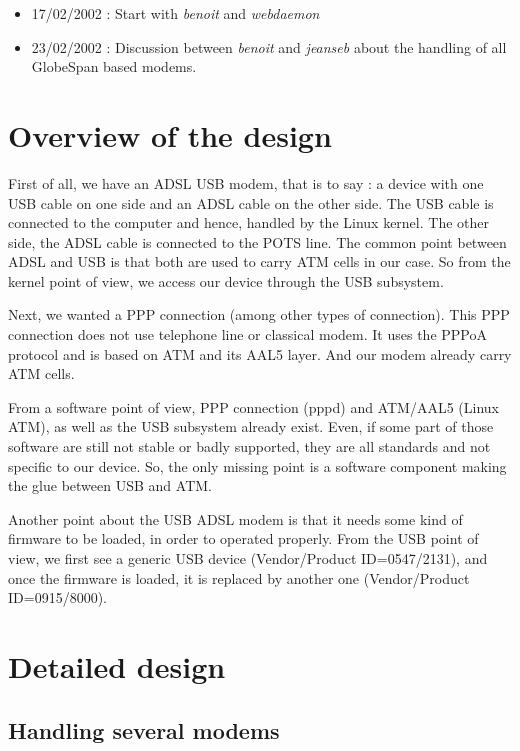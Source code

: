 \documentclass[a4paper,12pt]{article}
\begin{document}
\begin{itemize}
\item 17/02/2002 : Start with \textit{benoit} and \textit{webdaemon}
\item 23/02/2002 : Discussion between \textit{benoit} and
  \textit{jeanseb} about the handling of all GlobeSpan based modems.
\end{itemize}

\section{Overview of the design}

First of all, we have an ADSL USB modem, that is to say : a device
with one USB cable on one side and an ADSL cable on the other side.
The USB cable is connected to the computer and hence, handled by the
Linux kernel. The other side, the ADSL cable is connected to the POTS
line. The common point between ADSL and USB is that both are used to
carry ATM cells in our case. So from the kernel point of view, we
access our device through the USB subsystem.

Next, we wanted a PPP connection (among other types of connection).
This PPP connection does not use telephone line or classical modem. It
uses the PPPoA protocol and is based on ATM and its AAL5 layer. And
our modem already carry ATM cells.

From a software point of view, PPP connection (pppd) and ATM/AAL5
(Linux ATM), as well as the USB subsystem already exist. Even, if some
part of those software are still not stable or badly supported, they
are all standards and not specific to our device. So, the only missing
point is a software component making the glue between USB and ATM.

Another point about the USB ADSL modem is that it needs some kind of
firmware to be loaded, in order to operated properly. From the USB
point of view, we first see a generic USB device (Vendor/Product
ID=0547/2131), and once the firmware is loaded, it is replaced by
another one (Vendor/Product ID=0915/8000).

\section{Detailed design}

\subsection{Handling several modems}
\end{document}
